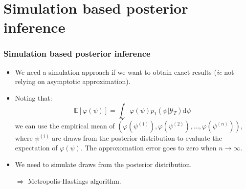 \documentclass[10pt,slidestop]{beamer}
\newcommand{\sample}{\mathcal Y_T}
\begin{document}
\section{Simulation based posterior inference}

\begin{frame}
  \frametitle{Simulation based posterior inference}

  \begin{itemize}

  \item We need a simulation approach if we want to obtain exact
    results  (\textit{ie} not relying on asymptotic approximation).

    \bigskip

  \item Noting that:
    \[
    \mathbb E \left[ \varphi(\psi) \right] = \int_{\Psi} \varphi (\psi) p_1(\psi|\sample)\mathrm d\psi
    \]
    we can use the empirical mean of $\left(\varphi(\psi^{(1)}),\varphi(\psi^{(2)}),\dots,\varphi(\psi^{(n)})\right)$,
    where $\psi^{(i)}$ are draws from the posterior distribution to evaluate the expectation of $\varphi
    (\psi)$. The approxomation error goes to zero when $n\rightarrow\infty$.

\bigskip

  \item We need to simulate draws from the posterior distribution.\newline

    $\Rightarrow$ Metropolis-Hastings algorithm.

\end{itemize}
\end{frame}
\end{document}

